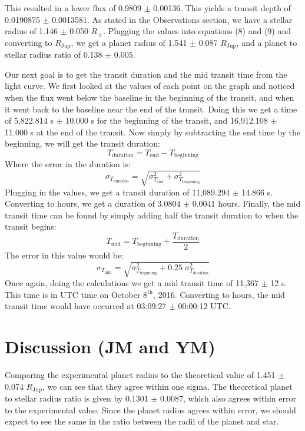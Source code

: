 \documentclass{aastex61}
\begin{document}
This resulted in a lower flux of 0.9809 $\pm$ 0.00136. This yields a transit depth of 0.0190875 $\pm$ 0.0013581. As stated in the Observations section, we have a stellar radius of 1.146 $\pm$ 0.050 $R_{\sun}$. Plugging the values into equations (8) and (9) and converting to $R_{\text{Jup}}$, we get a planet radius of 1.541 $\pm$ 0.087 $R_{\text{Jup}}$, and a planet to stellar radius ratio of 0.138 $\pm$ 0.005. 

Our next goal is to get the transit duration and the mid transit time from the light curve. We first looked at the values of each point on the graph and noticed when the flux went below the baseline in the beginning of the transit, and when it went back to the baseline near the end of the transit. Doing this we get a time of 5,822.814 s $\pm$ 10.000 s for the beginning of the transit, and 16,912.108  $\pm$ 11.000 s at the end of the transit. Now simply by subtracting the end time by the beginning, we will get the transit duration:
\begin{equation}
	T_{\text{duration}} = T_{\text{end}} - T_{\text{beginning}}
\end{equation}
Where the error in the duration is:
\begin{equation}
	\sigma_{T_{\text{duration}}} = \sqrt{\sigma_{T_{\text{end}}}^{2}+\sigma_{T_{\text{beginning}}}^{2}}
\end{equation}
Plugging in the values, we get a transit duration of 11,089.294 $\pm$ 14.866 s. Converting to hours, we get a duration of 3.0804 $\pm$ 0.0041 hours. Finally, the mid transit time can be found by simply adding half the transit duration to when the transit begins:
\begin{equation}
	T_{\text{mid}} = T_{\text{beginning}} +\frac{T_{\text{duration}}}{2}
\end{equation}
The error in this value would be:
\begin{equation}
	\sigma_{T_{\text{mid}}} = \sqrt{\sigma_{T_{\text{beginning}}}^{2}+0.25 \; \sigma_{T_{\text{duration}}}^{2}}
\end{equation}
Once again, doing the calculations we get a mid transit time of 11,367 $\pm$ 12 s. This time is in UTC time on October $8^{\text{th}}$, 2016. Converting to hours, the mid transit time would have occurred at 03:09:27 $\pm$ 00:00:12 UTC. 

\section{Discussion (JM and YM)}
Comparing the experimental planet radius to the theoretical value of 1.451 $\pm$ 0.074 $R_{\text{Jup}}$, we can see that they agree within one sigma. The theoretical planet to stellar radius ratio is given by 0.1301 $\pm$ 0.0087, which also agrees within error to the experimental value. Since the planet radius agrees within error, we should expect to see the same in the ratio between the radii of the planet and star. 
\end{document}
